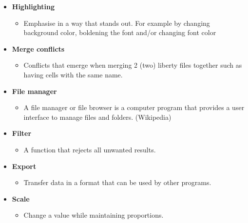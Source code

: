 \documentclass[10pt,a4paper]{report}
\newcommand{\itemglo}[3]{
    \label{glo:#1}\textbf{#2}
    \begin{itemize}[noitemsep, topsep=0pt, label=]
        \item #3
    \end{itemize}
}
\newcommand{\refer}[2]{\hyperref[#1]{\textcolor{col:reference}{#2}}}
\newcommand{\refg}[2]{\refer{glo:#1}{#2}}
\begin{document}
\begin{itemize}[label=]
    \item \itemglo{highlighting}{Highlighting}{Emphasise in a way that stands out. For example by changing background color, boldening the font and/or changing font color}
    \item \itemglo{merge_conflicts}{Merge conflicts}{Conflicts that emerge when merging 2 (two) liberty files together such as having cells with the same name.}
    \item \itemglo{file_manager}{File manager}{A file manager or file browser is a computer program that provides a user interface to manage files and folders. (Wikipedia)}
    \item \itemglo{filter}{Filter}{
    A function that rejects all unwanted results.}
    \item \itemglo{export}{Export}{
    Transfer data in a format that can be used by other programs.}
    \item \itemglo{scale}{Scale}{
    Change a value while maintaining proportions.}
\end{itemize}

\end{document}
